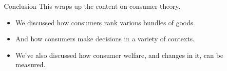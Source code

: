 \documentclass[12pt,t]{beamer}
\begin{document}
\begin{frame}{Conclusion}
  This wraps up the content on consumer theory.

  \bigskip
  \begin{itemize}
    \item We discussed how consumers rank various bundles of goods.

    \item  And how consumers make decisions in a variety of contexts.

    \item We've also discussed how consumer welfare, and changes in it, can be measured.
  \end{itemize}
\end{frame}
\end{document}
